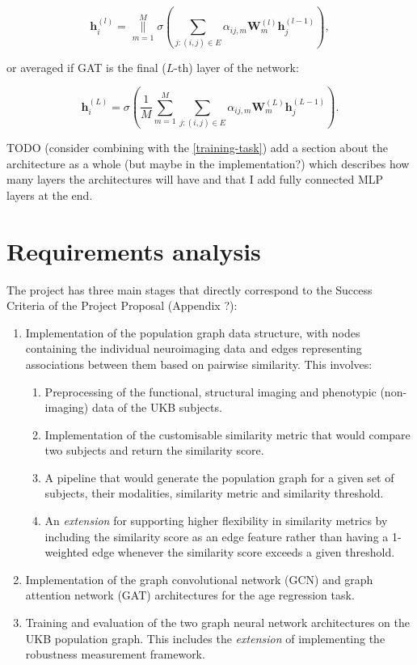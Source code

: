 \begin{equation}
    \mathbf{h}_i^{(l)} = \underset{m=1}{\overset{M}{\big\|}} \sigma\left(\sum\limits_{j: (i,j)\in E} \alpha_{ij, m}\mathbf{W}^{(l)}_m\mathbf{h}_j^{(l-1)}\right),
\end{equation}

or averaged if GAT is the final ($L$-th) layer of the network:

\begin{equation}
    \mathbf{h}_i^{(L)} = \sigma\left(\frac{1}{M}\sum\limits_{m=1}^M\sum\limits_{j: (i,j)\in E} \alpha_{ij, m}\mathbf{W}^{(L)}_m\mathbf{h}_j^{(L-1)}\right).
\end{equation}


TODO (consider combining with the \ref{training-task}) add a section about the architecture as a whole (but maybe in the implementation?) which describes how many layers the architectures will have and that I add fully connected MLP layers at the end.

\section{Requirements analysis}

The project has three main stages that directly correspond to the Success Criteria of the Project Proposal (Appendix ?):

\begin{enumerate}
    \item Implementation of the population graph data structure, with nodes containing the individual neuroimaging data and edges representing associations between them based on pairwise similarity. This involves: \begin{enumerate}
        \item Preprocessing of the functional, structural imaging and phenotypic (non-imaging) data of the UKB subjects.
        \item Implementation of the customisable similarity metric that would compare two subjects and return the similarity score.
        \item A pipeline that would generate the population graph for a given set of subjects, their modalities, similarity metric and similarity threshold.
        \item An \textit{extension} for supporting higher flexibility in similarity metrics by including the similarity score as an edge feature rather than having a 1-weighted edge whenever the similarity score exceeds a given threshold.
    \end{enumerate}
    \item Implementation of the graph convolutional network (GCN) and graph attention network (GAT) architectures for the age regression task. 
    \item Training and evaluation of the two graph neural network architectures on the UKB population graph. This includes the \textit{extension} of implementing the robustness measurement framework.
\end{enumerate}

